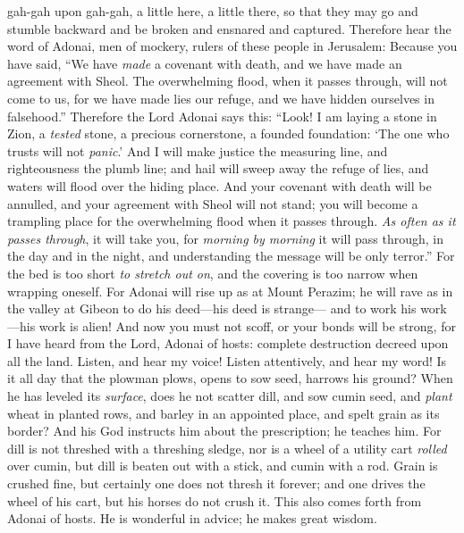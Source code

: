 \begin{biblechapter}
gah-gah upon gah-gah, 
a little here, a little there, 
so that they may go and stumble backward 
and be broken and ensnared and captured.
 Therefore hear the word of Adonai, men of mockery, 
rulers of these people in Jerusalem:
\verse Because you have said, “We have \textit{made} a covenant with death, 
and we have made an agreement with Sheol. The overwhelming flood, when it passes through, will not come to us, for we have made lies our refuge, 
and we have hidden ourselves in falsehood.”
\verse Therefore the Lord Adonai says this: “Look! I am laying a stone in Zion, 
a \textit{tested} stone, 
a precious cornerstone, 
a founded foundation: ‘The one who trusts will not \textit{panic}.’
\verse And I will make justice the measuring line, 
and righteousness the plumb line; 
and hail will sweep away the refuge of lies, 
and waters will flood over the hiding place.
\verse And your covenant with death will be annulled, 
and your agreement with Sheol will not stand; 
you will become a trampling place for the overwhelming flood when it passes through.
\verse \textit{As often as it passes through}, it will take you, 
for \textit{morning by morning} it will pass through, 
in the day and in the night, and understanding the message will be only terror.”
\verse For the bed is too short \textit{to stretch out on}, 
and the covering is too narrow when wrapping oneself.
\verse For Adonai will rise up as at Mount Perazim; 
he will rave as in the valley at Gibeon 
to do his deed—his deed is strange— 
and to work his work—his work is alien!
\verse And now you must not scoff, 
or your bonds will be strong, for I have heard from the Lord, Adonai of hosts: complete destruction 
decreed upon all the land.
 Listen, and hear my voice! 
Listen attentively, and hear my word!
\verse Is it all day that the plowman plows, 
opens to sow seed, harrows his ground?
\verse When he has leveled its \textit{surface}, does he not scatter dill, 
and sow cumin seed, 
and \textit{plant} wheat in planted rows, 
and barley in an appointed place, 
and spelt grain as its border?
\verse And his God instructs him about the prescription; 
he teaches him.
\verse For dill is not threshed with a threshing sledge, 
nor is a wheel of a utility cart \textit{rolled} over cumin, 
but dill is beaten out with a stick, 
and cumin with a rod.
\verse Grain is crushed fine, 
but certainly one does not thresh it forever; 
and one drives the wheel of his cart, 
but his horses do not crush it.
\verse This also comes forth from Adonai of hosts. He is wonderful in advice; 
he makes great wisdom.
\end{biblechapter}

